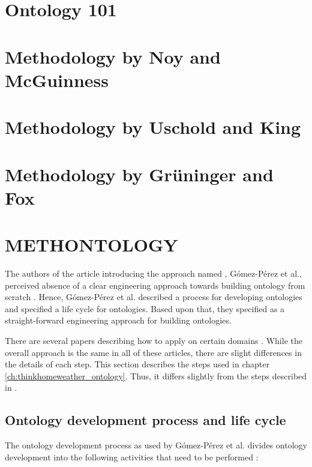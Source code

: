 
\section{Ontology 101}

\section{Methodology by Noy and McGuinness}

\section{Methodology by Uschold and King}

\section{Methodology by Grüninger and Fox}

\section{METHONTOLOGY}

The authors of the article introducing the approach named \methontology, Gómez-Pérez et al., perceived absence of a clear engineering approach towards building ontology from scratch \cite{Methontology}. Hence, Gómez-Pérez et al. described a process for developing ontologies and specified a life cycle for ontologies. Based upon that, they specified \methontology as a straight-forward engineering approach for building ontologies.

There are several papers describing how to apply \methontology on certain domains \cite{MethontologyLegal} \cite{MethontologyChemical}. While the overall approach is the same in all of these articles, there are slight differences in the details of each step. This section describes the steps used in chapter \ref{ch:thinkhomeweather_ontology}. Thus, it differs slightly from the steps described in \cite{Methontology}.

\subsection{Ontology development process and life cycle}

The ontology development process as used by Gómez-Pérez et al. divides ontology development into the following activities that need to be performed \cite{Methontology}:

